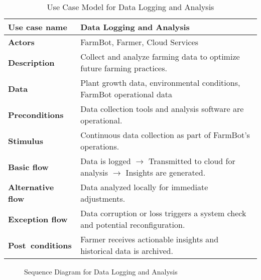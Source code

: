 \begin{table}[H]
\centering
\begin{tabular}{|p{4cm}|p{9cm}|}
\hline
\textbf{Use case name}    & Data Logging and Analysis \\
\hline
\textbf{Actors}           & FarmBot, Farmer, Cloud Services \\
\hline
\textbf{Description}      & Collect and analyze farming data to optimize future farming practices. \\
\hline
\textbf{Data}             & Plant growth data, environmental conditions, FarmBot operational data \\
\hline
\textbf{Preconditions}    & Data collection tools and analysis software are operational. \\
\hline
\textbf{Stimulus}         & Continuous data collection as part of FarmBot's operations. \\
\hline
\textbf{Basic flow}       & Data is logged $\rightarrow$ Transmitted to cloud for analysis $\rightarrow$ Insights are generated. \\
\hline
\textbf{Alternative flow} & Data analyzed locally for immediate adjustments. \\
\hline
\textbf{Exception flow}   & Data corruption or loss triggers a system check and potential reconfiguration. \\
\hline
\textbf{Post conditions}  & Farmer receives actionable insights and historical data is archived. \\
\hline
\end{tabular}
\caption{Use Case Model for Data Logging and Analysis}
\end{table}

\begin{figure}[H]
    \centering

\caption{Sequence Diagram for Data Logging and Analysis}
\end{figure}

